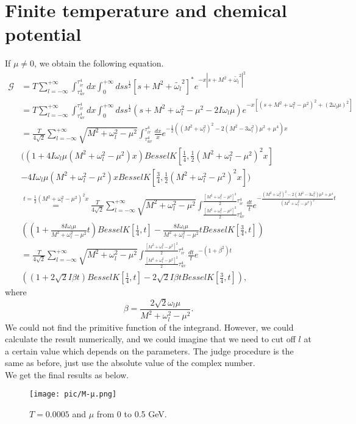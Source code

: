 \documentclass{article}
\begin{document}
\section{Finite temperature and chemical potential}
If $\mu\neq0$, we obtain the following equation.
\begin{equation}
    \begin{split}
        \mathcal{G} &=T\sum_{l=-\infty}^{+\infty}\int_{\tau_{uv}^4}^{\tau_{ir}^4}dx\int_{0}^{+\infty}ds s^{\frac{1}{2}}[s+M^2+\widetilde{\omega_l}^2]^*e^{-x|s+M^2+\widetilde{\omega_l}^2|^2}\\
        &=T\sum_{l=-\infty}^{+\infty}\int_{\tau_{uv}^4}^{\tau_{ir}^4}dx\int_{0}^{+\infty}ds s^{\frac{1}{2}}(s+M^2+\omega_l^2-\mu^2-2I\omega_l\mu)e^{-x[(s+M^2+\omega_l^2-\mu^2)^2+(2\omega_l\mu)^2]}\\
        &=\frac{T}{4\sqrt{2}}\sum_{l=-\infty}^{+\infty}\sqrt{M^2+\omega_l^2-\mu^2}\int_{\tau_{uv}^4}^{\tau_{ir}^4}
        \frac{dx}{x}e^{-\frac{1}{2}((M^2+\omega_l^2)^2-2(M^2-3\omega_l^2)\mu^2+\mu^4)x}\\
        &((1+4I\omega_l\mu(M^2+\omega_l^2-\mu^2)x)BesselK[\frac{1}{4},\frac{1}{2}(M^2+\omega_l^2-\mu^2)^2x]\\
        &-4I\omega_l\mu(M^2+\omega_l^2-\mu^2)x BesselK[\frac{3}{4},\frac{1}{2}(M^2+\omega_l^2-\mu^2)^2x])\\
        &\stackrel{t=\frac{1}{2}(M^2+\omega_l^2-\mu^2)^2x}{=}\frac{T}{4\sqrt{2}}\sum_{l=-\infty}^{+\infty}\sqrt{M^2+\omega_l^2-\mu^2}\int_{\frac{[M^2+\omega_l^2-\mu^2]^2}{2}\tau_{uv}^4}^{\frac{[M^2+\omega_l^2-\mu^2]^2}{2}\tau_{ir}^4}\frac{dt}{t}e^{-\frac{(M^2+\omega_l^2)^2-2(M^2-3\omega_l^2)\mu^2+\mu^4}{(M^2+\omega_l^2-\mu^2)^2}t}\\
        &((1+\frac{8I\omega_l\mu}{M^2+\omega_l^2-\mu^2}t)BesselK[\frac{1}{4},t]-\frac{8I\omega_l\mu}{M^2+\omega_l^2-\mu^2}t BesselK[\frac{3}{4},t])\\
        &=\frac{T}{4\sqrt{2}}\sum_{l=-\infty}^{+\infty}\sqrt{M^2+\omega_l^2-\mu^2}\int_{\frac{[M^2+\omega_l^2-\mu^2]^2}{2}\tau_{uv}^4}^{\frac{[M^2+\omega_l^2-\mu^2]^2}{2}\tau_{ir}^4}\frac{dt}{t}e^{-(1+\beta^2)t}\\
        &((1+2\sqrt{2}I\beta t)BesselK[\frac{1}{4},t]-2\sqrt{2}I\beta t BesselK[\frac{3}{4},t]),
    \end{split}
\end{equation}
where
\begin{equation}
    \beta=\frac{2\sqrt{2}\omega_l\mu}{M^2+\omega_l^2-\mu^2}.
\end{equation}
We could not find the primitive function of the integrand. However, we could calculate the result numerically, and we could imagine that we need to cut off $l$ at a certain value which depends on the parameters. The judge procedure is the same as before, just use the absolute value of the complex number.\\
We get the final results as below.
    \begin{figure}[H]
    \centering
    \texttt{[image: pic/M-μ.png]}
    \caption{$T=0.0005$ and $\mu$ from 0 to 0.5 GeV.}
    \end{figure}
\newpage
\end{document}
